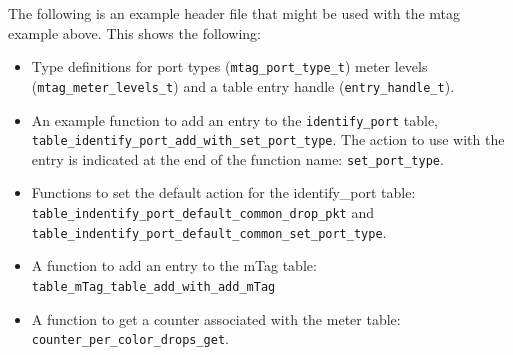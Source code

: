 \documentclass[12pt]{article}
\begin{document}
The following is an example header file that might be used with the mtag example 
above. This shows the following:

\begin{itemize}
\item
Type definitions for port types (\texttt{mtag_port_type_t}) meter levels \\
(\texttt{mtag_meter_levels_t}) 
and a table entry handle (\texttt{entry_handle_t}).  
\item
An example function to add an entry to the \texttt{identify_port} table, \\
\texttt{table_identify_port_add_with_set_port_type}. 
The action to use with the entry is indicated at the end of the function name: 
\texttt{set_port_type}.
\item
Functions to set the default action for the identify_port table: \\
\texttt{table_indentify_port_default_common_drop_pkt} and \\
\texttt{table_indentify_port_default_common_set_port_type}.
\item
A function to add an entry to the mTag table: \\
\texttt{table_mTag_table_add_with_add_mTag}
\item
A function to get a counter associated with the meter table: \\
\texttt{counter_per_color_drops_get}.
\end{itemize}
\end{document}
